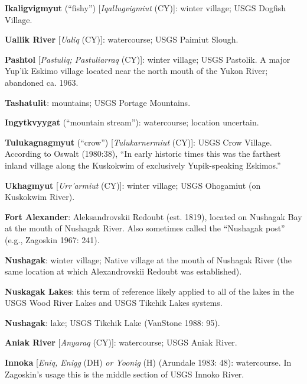 \begin{hang}
\textbf{Ikaligvigmyut} (“fishy”) [\textit{Iqallugvigmiut} (CY)]: winter village; USGS Dogfish Village.



\textbf{Uallik River} [\textit{Ualiq} (CY)]: watercourse; USGS Paimiut Slough.



\textbf{Pashtol} [\textit{Pastuliq; Pastuliarraq} (CY)]: winter village; USGS Pastolik. A major Yup’ik Eskimo village located near the north mouth of the Yukon River; abandoned ca. 1963.



\textbf{Tashatulit}: mountains; USGS Portage Mountains.



\textbf{Ingytkvyygat} (“mountain stream”): watercourse; location uncertain.



\textbf{Tulukagnagmyut} (“crow”) [\textit{Tulukarnermiut} (CY)]: USGS Crow Village. According to Oswalt (1980:38), “In early historic times this was the farthest inland village along the Kuskokwim of exclusively Yupik-speaking Eskimos.”



\textbf{Ukhagmyut} [\textit{Urr’armiut} (CY)]: winter village; USGS Ohogamiut (on Kuskokwim River).



\textbf{Fort Alexander}: Aleksandrovskii Redoubt (est. 1819), located on Nushagak Bay at the mouth of Nushagak River. Also sometimes called the “Nushagak post” (e.g., Zagoskin 1967: 241).\textbf{ }



\textbf{Nushagak}: winter village; Native village at the mouth of Nushagak River (the same location at which Alexandrovskii Redoubt was established).



\textbf{Nuskagak Lakes}: this term of reference likely applied to all of the lakes in the USGS Wood River Lakes and USGS Tikchik Lakes systems.



\textbf{Nushagak}: lake; USGS Tikchik Lake (VanStone 1988: 95).



\textbf{Aniak River} [\textit{Anyaraq} (CY)]: watercourse; USGS Aniak River.



\textbf{Innoka} [\textit{Eniq, Enigg }(DH) \textit{or Yoonig} (H) (Arundale 1983: 48): watercourse. In Zagoskin’s usage this is the middle section of USGS Innoko River.




\end{hang}
